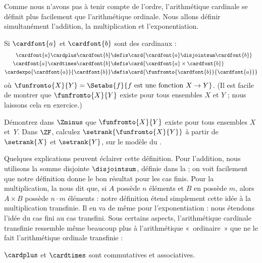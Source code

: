 \documentclass[../../../include/open-logic-section]{subfiles}
\begin{document}

Comme nous n'avons pas à tenir compte de l'ordre,
l'arithmétique cardinale se définit plus facilement que
l'arithmétique ordinale. Nous allons définir simultanément
l'addition, la multiplication et l'exponentiation.

\begin{defn}
Si $\cardfont{a}$ et $\cardfont{b}$ sont des cardinaux :
\begin{align*}
	\cardfont{a} \cardplus \cardfont{b} &\defis
	\card{\cardfont{a} \disjointsum \cardfont{b}}\\
	\cardfont{a} \cardtimes \cardfont{b} &\defis
	\card{\cardfont{a} \times \cardfont{b}}\\
	\cardexpo{\cardfont{a}}{\cardfont{b}} &\defis
	\card{\funfromto{\cardfont{b}}{\cardfont{a}}}
\end{align*}
où $\funfromto{X}{Y} = \Setabs{f}{f \text{ est une fonction } X \to Y}$.
(Il est facile de montrer que $\funfromto{X}{Y}$ existe
pour tous ensembles $X$ et $Y$ ; nous laissons cela en exercice.)
\end{defn}

\begin{prob}
Démontrez dans $\Zminus$ que $\funfromto{X}{Y}$ existe
pour tous ensembles $X$ et~$Y$. Dans $\ZF$, calculez
$\setrank{\funfromto{X}{Y}}$ à partir de
$\setrank{X}$ et $\setrank{Y}$, sur le modèle du
.
\end{prob}

Quelques explications peuvent éclairer cette définition.
Pour l'addition, nous utilisons la somme disjointe
$\disjointsum$, définie dans la
 ; on voit
facilement que notre définition donne le bon résultat
pour les cas finis. Pour la multiplication,
la  nous dit que,
si $A$ possède $n$ éléments et $B$ en possède $m$,
alors $A \times B$ possède $n \cdot m$ éléments :
notre définition étend simplement cette idée à la
multiplication transfinie. Il en va de même pour
l'exponentiation : nous étendons l'idée du cas fini
au cas transfini. Sous certains aspects, l'arithmétique
cardinale transfinie ressemble même beaucoup plus à
l'arithmétique «~ordinaire~» que ne le fait
l'arithmétique ordinale transfinie :

\begin{prop}
$\cardplus$ et $\cardtimes$ sont commutatives et associatives.
\end{prop}
\end{document}
